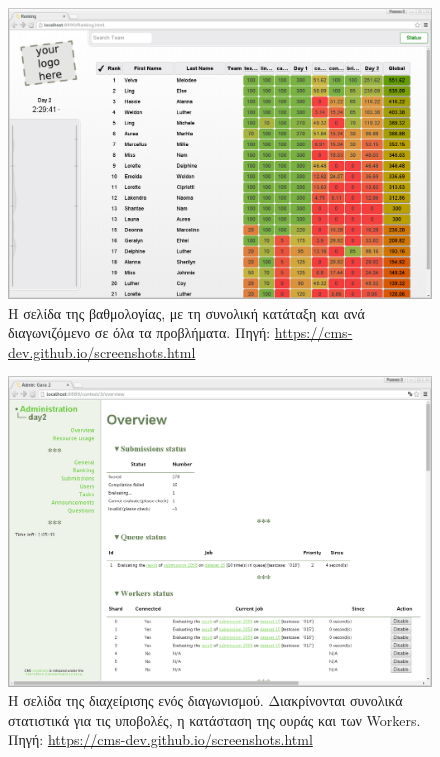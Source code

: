 \documentclass[diploma]{softlab-thesis}
\begin{document}
\begin{figure}
  \centering
  \includegraphics[scale=0.3,trim=4 4 4 4,clip]{Figures/cmsranking.png}
  \caption[Σελίδα βαθμολογιών CMS]{Η σελίδα της βαθμολογίας, με τη συνολική κατάταξη
  και ανά διαγωνιζόμενο σε όλα τα προβλήματα. Πηγή: \url{https://cms-dev.github.io/screenshots.html}}
\end{figure}

\begin{figure}
  \centering
  \includegraphics[scale=0.3,trim=4 4 4 4,clip]{Figures/cmsadmin.png}
  \caption[Σελίδα διαχείρισης διαγωνισμού CMS]{Η σελίδα της διαχείρισης ενός
  διαγωνισμού. Διακρίνονται συνολικά στατιστικά για τις υποβολές, η κατάσταση
  της ουράς και των Workers. Πηγή: \url{https://cms-dev.github.io/screenshots.html}}
\end{figure}
\end{document}
